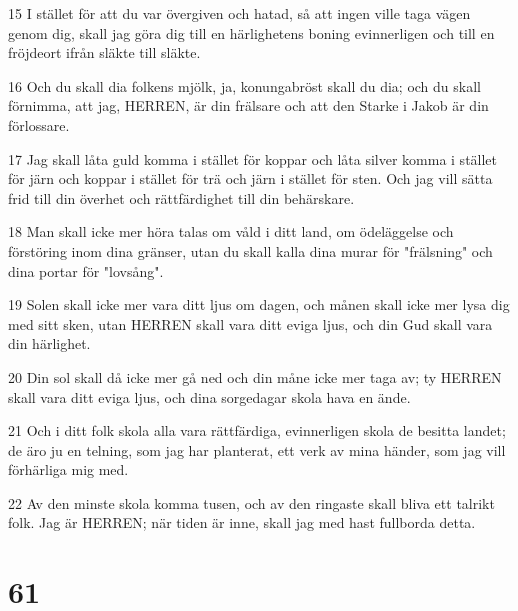 \par 15 I stället för att du var övergiven och hatad, så att ingen ville taga vägen genom dig, skall jag göra dig till en härlighetens boning evinnerligen och till en fröjdeort ifrån släkte till släkte.
\par 16 Och du skall dia folkens mjölk, ja, konungabröst skall du dia; och du skall förnimma, att jag, HERREN, är din frälsare och att den Starke i Jakob är din förlossare.
\par 17 Jag skall låta guld komma i stället för koppar och låta silver komma i stället för järn och koppar i stället för trä och järn i stället för sten. Och jag vill sätta frid till din överhet och rättfärdighet till din behärskare.
\par 18 Man skall icke mer höra talas om våld i ditt land, om ödeläggelse och förstöring inom dina gränser, utan du skall kalla dina murar för "frälsning" och dina portar för "lovsång".
\par 19 Solen skall icke mer vara ditt ljus om dagen, och månen skall icke mer lysa dig med sitt sken, utan HERREN skall vara ditt eviga ljus, och din Gud skall vara din härlighet.
\par 20 Din sol skall då icke mer gå ned och din måne icke mer taga av; ty HERREN skall vara ditt eviga ljus, och dina sorgedagar skola hava en ände.
\par 21 Och i ditt folk skola alla vara rättfärdiga, evinnerligen skola de besitta landet; de äro ju en telning, som jag har planterat, ett verk av mina händer, som jag vill förhärliga mig med.
\par 22 Av den minste skola komma tusen, och av den ringaste skall bliva ett talrikt folk. Jag är HERREN; när tiden är inne, skall jag med hast fullborda detta.

\chapter{61}

